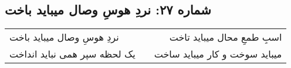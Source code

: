 \begin{center}
\section*{شماره ۲۷: نردِ هوسِ وصال میباید باخت}
\label{sec:027}
\begin{longtable}{l p{0.5cm} r}
نردِ هوسِ وصال میباید باخت
&&
اسبِ طمعِ محال میباید تاخت
\\
یک لحظه سپر همی نباید انداخت
&&
میباید سوخت و کار میباید ساخت
\\
\end{longtable}
\end{center}
